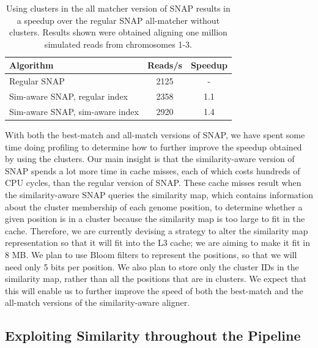 \documentclass[twocolumn,10pt]{article}
\begin{document}
\begin{table}
\centering
\begin{tabular}{| l || c | c |}
\hline
\vrule height 10pt depth 0pt width 0pt \textbf{Algorithm} & \textbf{Reads/s} & \textbf{Speedup}\\
\hline
\vrule height 10pt depth 0pt width 0pt Regular SNAP & 2125 & -\\
\hline
\vrule height 10pt depth 0pt width 0pt Sim-aware SNAP, regular index & 2358 & 1.1\\
\hline
\vrule height 10pt depth 0pt width 0pt Sim-aware SNAP, sim-aware index & 2920 & 1.4\\
\hline
\end{tabular}
\caption{Using clusters in the all matcher version of SNAP results in a speedup over the regular SNAP all-matcher without clusters.  Results shown were obtained aligning one million simulated reads from chromosomes 1-3.}
\label{table:allMatcher}
\end{table}

With both the best-match and all-match versions of SNAP, we have spent some time doing profiling to determine how to further improve the speedup obtained by using the clusters.  Our main insight is that the similarity-aware version of SNAP spends a lot more time in cache misses, each of which costs hundreds of CPU cycles, than the regular version of SNAP.  These cache misses result when the similarity-aware SNAP queries the similarity map, which contains information about the cluster membership of each genome position, to determine whether a given position is in a cluster because the similarity map is too large to fit in the cache.  Therefore, we are currently devising a strategy to alter the similarity map representation so that it will fit into the L3 cache; we are aiming to make it fit in 8 MB.  We plan to use Bloom filters to represent the positions, so that we will need only 5 bits per position.  We also plan to store only the cluster IDs in the similarity map, rather than all the positions that are in clusters.  We expect that this will enable us to further improve the speed of both the best-match and the all-match versions of the similarity-aware aligner.

\subsection{Exploiting Similarity throughout the Pipeline}
\end{document}
